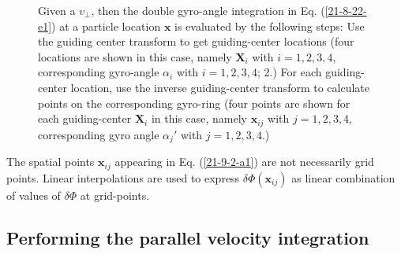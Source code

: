 \documentclass{article}
\begin{document}
\begin{figure}[h]
  \caption{\label{21-8-22-a1}Given a $v_{\perp}$, then the double gyro-angle
  integration in Eq. (\ref{21-8-22-e1}) at a particle location $\mathbf{x}$ is
  evaluated by the following steps: Use the guiding center transform to get
  guiding-center locations (four locations are shown in this case, namely
  $\mathbf{X}_i$ with $i = 1, 2, 3, 4$, corresponding gyro-angle $\alpha_i$
  with $i = 1, 2, 3, 4$; 2.) For each guiding-center location, use the inverse
  guiding-center transform to calculate points on the corresponding gyro-ring
  (four points are shown for each guiding-center $\mathbf{X}_i$ in this case,
  namely $\mathbf{x}_{i j}$ with $j = 1, 2, 3, 4$, corresponding gyro angle
  $\alpha_j'$ with $j = 1, 2, 3, 4$.)}
\end{figure}

The spatial points $\mathbf{x}_{i j}$ appearing in Eq. (\ref{21-9-2-a1}) are
not necessarily grid points. Linear interpolations are used to express $\delta
\Phi (\mathbf{x}_{i j})$ as linear combination of values of $\delta \Phi$ at
grid-points.

\subsection{Performing the parallel velocity integration}
\end{document}
